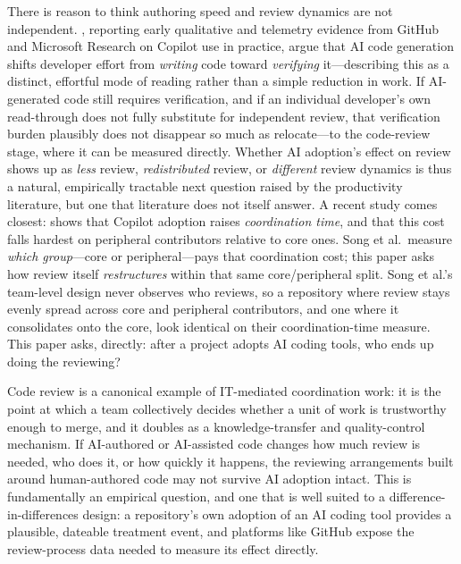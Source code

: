 \documentclass[12pt]{article}
\begin{document}
There is reason to think authoring speed and review dynamics are not
independent. \citet{bird2023taking}, reporting early qualitative and
telemetry evidence from GitHub and Microsoft Research on Copilot use in
practice, argue that AI code generation shifts developer effort from
\emph{writing} code toward \emph{verifying} it---describing this as a
distinct, effortful mode of reading rather than a simple reduction in
work. If AI-generated code still requires verification, and if an
individual developer's own read-through does not fully substitute for
independent review, that verification burden plausibly does not disappear
so much as relocate---to the code-review stage, where it can be measured
directly. Whether AI adoption's effect on review shows up as \emph{less}
review, \emph{redistributed} review, or \emph{different} review dynamics
is thus a natural, empirically tractable next question raised by the
productivity literature, but one that literature does not itself answer.
A recent study comes closest: \citet{song2026impact} shows that Copilot
adoption raises \emph{coordination time}, and that this cost falls
hardest on peripheral contributors relative to core ones. Song et al.\
measure \emph{which group}---core or peripheral---pays that coordination
cost; this paper asks how review itself \emph{restructures} within that
same core/peripheral split. Song et al.'s team-level design never
observes who reviews, so a repository where review stays evenly spread
across core and peripheral contributors, and one where it consolidates
onto the core, look identical on their coordination-time measure. This
paper asks, directly: after a project adopts AI coding tools, who ends
up doing the reviewing?

Code review is a canonical example of IT-mediated coordination work: it is
the point at which a team collectively decides whether a unit of work is
trustworthy enough to merge, and it doubles as a knowledge-transfer and
quality-control mechanism. If AI-authored or AI-assisted code changes how
much review is needed, who does it, or how quickly it happens, the
reviewing arrangements built around human-authored code may not survive
AI adoption intact. This is fundamentally an empirical question, and one
that is well suited to a difference-in-differences design: a repository's
own adoption of an AI coding tool provides a plausible, dateable treatment
event, and platforms like GitHub expose the review-process data needed to
measure its effect directly.
\end{document}
